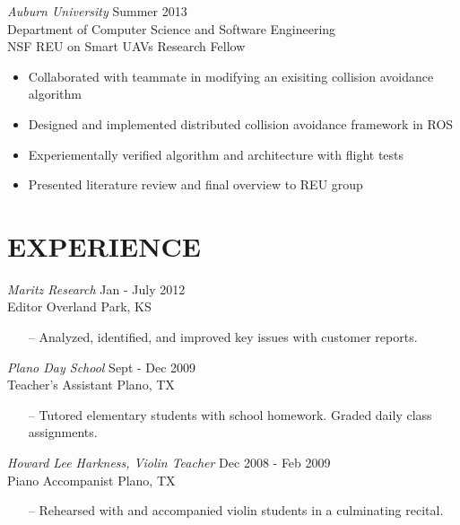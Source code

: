 \documentclass[line,margin]{res}
\begin{document}
\begin{resume}
		{\sl Auburn University}  \hfill  Summer 2013\\
		Department of Computer Science and Software Engineering  \\
		NSF REU on Smart UAVs Research Fellow
                 \begin{itemize}[leftmargin=5mm]  \itemsep -2pt %
                 \item Collaborated with teammate in modifying an exisiting collision avoidance algorithm 
		 \item Designed and implemented distributed collision avoidance framework in ROS 
		 \item Experiementally verified algorithm and architecture with flight tests 
		 \item Presented literature review and final overview to REU group 
                 \end{itemize} 
  
\section{EXPERIENCE} 
		
		{\it Maritz Research } \hfill            Jan - July 2012\\
		Editor 		\hfill Overland Park, KS
                 \begin{itemize} [leftmargin=5mm]  \itemsep -2pt %
                 \item[--]  Analyzed, identified, and improved  key issues with customer reports.
                 \end{itemize} 
                {\it Plano Day School} \hfill        Sept - Dec  2009\\
        	Teacher's Assistant \hfill Plano, TX 
		\begin{itemize} [leftmargin=5mm] 
                   \item [--] Tutored elementary students with school homework. Graded daily class assignments. 
                   \end{itemize} 

              {\it Howard Lee Harkness, Violin Teacher} \hfill        Dec 2008 - Feb 2009\\
        	Piano Accompanist \hfill Plano, TX 
		\begin{itemize} [leftmargin=5mm] 
                   \item [--] Rehearsed with and accompanied violin students in a culminating recital. 
                   \end{itemize} 


\end{resume}
\end{document}
